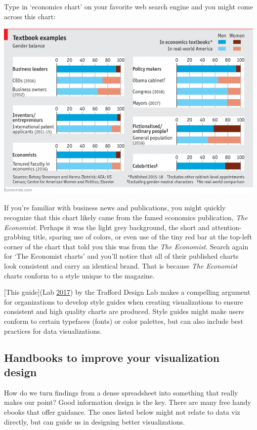 \documentclass[]{book}
\begin{document}
Type in `economics chart' on your favorite web search engine and you might come across this chart:

\includegraphics{images/economist_gender.png}

If you're familiar with business news and publications, you might quickly recognize that this chart likely came from the famed economics publication, \emph{The Economist}. Perhaps it was the light grey background, the short and attention-grabbing title, sparing use of colors, or even use of the tiny red bar at the top-left corner of the chart that told you this was from the \emph{The Economist}. Search again for `The Economist charts' and you'll notice that all of their published charts look consistent and carry an identical brand. That is because \emph{The Economist} charts conform to a style unique to the magazine.

{[}This guide{]}(Lab \protect\hyperlink{ref-Trafford}{2017}) by the Trafford Design Lab makes a compelling argument for organizations to develop style guides when creating visualizations to ensure consistent and high quality charts are produced. Style guides might make users conform to certain typefaces (fonts) or color palettes, but can also include best practices for data visualizations.

\hypertarget{handbooks-to-improve-your-visualization-design}{%
\subsection{Handbooks to improve your visualization design}\label{handbooks-to-improve-your-visualization-design}}

How do we turn findings from a dense spreadsheet into something that really makes our point? Good information design is the key. There are many free handy ebooks that offer guidance. The ones listed below might not relate to data viz directly, but can guide us in designing better visualizations.
\end{document}
